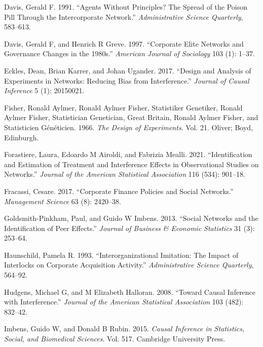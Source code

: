 \documentclass[
  a4paper,
]{article}
\newlength{\cslhangindent}
\newenvironment{CSLReferences}[2] %
 {\begin{list}{}{%
  \setlength{\itemindent}{0pt}
  \setlength{\leftmargin}{0pt}
  \setlength{\parsep}{0pt}
  \ifodd #1
   \setlength{\leftmargin}{\cslhangindent}
   \setlength{\itemindent}{-1\cslhangindent}
  \fi
  \setlength{\itemsep}{#2\baselineskip}}}
 {\end{list}}
\begin{document}
\begin{CSLReferences}{1}{0}
Davis, Gerald F. 1991. {``Agents Without Principles? The Spread of the
Poison Pill Through the Intercorporate Network.''} \emph{Administrative
Science Quarterly}, 583--613.

Davis, Gerald F, and Henrich R Greve. 1997. {``Corporate Elite Networks
and Governance Changes in the 1980s.''} \emph{American Journal of
Sociology} 103 (1): 1--37.

Eckles, Dean, Brian Karrer, and Johan Ugander. 2017. {``Design and
Analysis of Experiments in Networks: Reducing Bias from Interference.''}
\emph{Journal of Causal Inference} 5 (1): 20150021.

Fisher, Ronald Aylmer, Ronald Aylmer Fisher, Statistiker Genetiker,
Ronald Aylmer Fisher, Statistician Genetician, Great Britain, Ronald
Aylmer Fisher, and Statisticien Généticien. 1966. \emph{The Design of
Experiments}. Vol. 21. Oliver; Boyd, Edinburgh.

Forastiere, Laura, Edoardo M Airoldi, and Fabrizia Mealli. 2021.
{``Identification and Estimation of Treatment and Interference Effects
in Observational Studies on Networks.''} \emph{Journal of the American
Statistical Association} 116 (534): 901--18.

Fracassi, Cesare. 2017. {``Corporate Finance Policies and Social
Networks.''} \emph{Management Science} 63 (8): 2420--38.

Goldsmith-Pinkham, Paul, and Guido W Imbens. 2013. {``Social Networks
and the Identification of Peer Effects.''} \emph{Journal of Business \&
Economic Statistics} 31 (3): 253--64.

Haunschild, Pamela R. 1993. {``Interorganizational Imitation: The Impact
of Interlocks on Corporate Acquisition Activity.''} \emph{Administrative
Science Quarterly}, 564--92.

Hudgens, Michael G, and M Elizabeth Halloran. 2008. {``Toward Causal
Inference with Interference.''} \emph{Journal of the American
Statistical Association} 103 (482): 832--42.

Imbens, Guido W, and Donald B Rubin. 2015. \emph{Causal Inference in
Statistics, Social, and Biomedical Sciences}. Vol. 517. Cambridge
University Press.


\end{CSLReferences}
\end{document}
